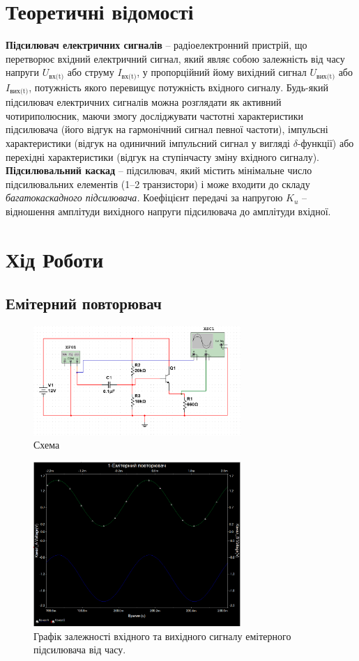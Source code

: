 \documentclass[
  ukrainian,
  14pt
]{extreport}
\begin{document}
\section{Теоретичні відомості}
\textbf{Підсилювач електричних сигналів} – радіоелектронний пристрій, що
перетворює вхідний електричний сигнал, який являє собою залежність від часу
напруги $U_{\text{вх(t)}}$ або струму $I_{\text{вх(t)}}$, у пропорційний йому вихідний сигнал $U_{\text{вих(t)}}$ або
$I_{\text{вих(t)}}$, потужність якого перевищує потужність вхідного сигналу. Будь-який
підсилювач електричних сигналів можна розглядати як активний чотириполюсник,
маючи змогу досліджувати частотні характеристики підсилювача (його відгук на
гармонічний сигнал певної частоти), імпульсні характеристики (відгук на
одиничний імпульсний сигнал у вигляді $\delta$-функції) або перехідні характеристики
(відгук на ступінчасту зміну вхідного сигналу).
\textbf{Підсилювальний каскад} – підсилювач, який містить мінімальне число
підсилювальних елементів (1–2 транзистори) і може входити до складу
\textit{багатокаскадного підсилювача.}
Коефіцієнт передачі за напругою $K_u$ – відношення амплітуди вихідного
напруги підсилювача до амплітуди вхідної.

\section{Хід Роботи}
\subsection{Емітерний повторювач}
\begin{figure}[H]
  \includegraphics[width=0.7\textwidth]{imgs/1-1.png}
  \centering
  \caption{Схема}
\end{figure}
\begin{figure}[H]
  \includegraphics[width=0.7\textwidth]{imgs/1-2.png}
  \centering
  \caption{Графік залежності вхідного та вихідного сигналу емітерного підсилювача від часу.
  }
\end{figure}
\end{document}

